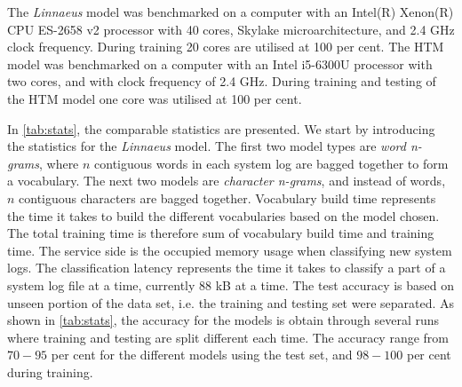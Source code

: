 The \textit{Linnaeus} model was benchmarked on a computer with an Intel(R) Xenon(R) CPU ES-2658 v2 processor with 40 cores, Skylake microarchitecture, and 2.4 GHz clock frequency. During training 20 cores are utilised at 100 per cent. The HTM model was benchmarked on a computer with an Intel i5-6300U processor with two cores, and with clock frequency of 2.4 GHz. During training and testing of the HTM model one core was utilised at 100 per cent.


In \autoref{tab:stats}, the comparable statistics are presented. We start by introducing the statistics for the \textit{Linnaeus} model. The first two model types are \textit{word n-grams}, where $n$ contiguous words in each system log are bagged together to form a vocabulary. The next two models are \textit{character n-grams}, and instead of words, $n$ contiguous characters are bagged together. Vocabulary build time represents the time it takes to build the different vocabularies based on the model chosen. The total training time is therefore sum of vocabulary build time and training time. The service side is the occupied memory usage when classifying new system logs. The classification latency represents the time it takes to classify a part of a system log file at a time, currently 88 kB at a time. The test accuracy is based on unseen portion of the data set, i.e. the training and testing set were separated. As shown in \autoref{tab:stats}, the accuracy for the models is obtain through several runs where training and testing are split different each time. The accuracy range from $70-95$ per cent for the different models using the test set, and $98-100$ per cent during training.



